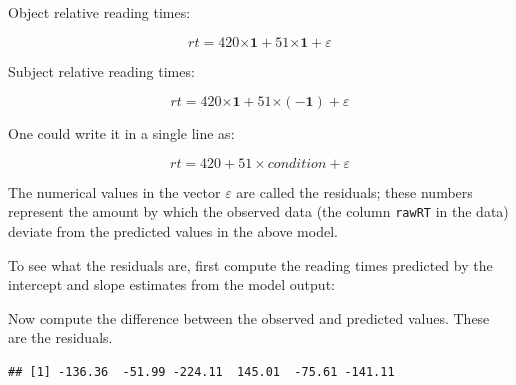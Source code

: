 \documentclass[
  12pt,
]{krantz}
\newenvironment{Shaded}{\begin{snugshade}}{\end{snugshade}}
\newcommand{\AttributeTok}[1]{\textcolor[rgb]{0.77,0.63,0.00}{#1}}
\newcommand{\DecValTok}[1]{\textcolor[rgb]{0.00,0.00,0.81}{#1}}
\newcommand{\FunctionTok}[1]{\textcolor[rgb]{0.00,0.00,0.00}{#1}}
\newcommand{\NormalTok}[1]{#1}
\newcommand{\OtherTok}[1]{\textcolor[rgb]{0.56,0.35,0.01}{#1}}
\newcommand{\SpecialCharTok}[1]{\textcolor[rgb]{0.00,0.00,0.00}{#1}}
\theoremstyle{definition}
\theoremstyle{definition}
\theoremstyle{definition}
\theoremstyle{definition}
\theoremstyle{remark}
\begin{document}
Object relative reading times:

\begin{equation}
rt = 420\mathbf{\times 1} + 51\mathbf{\times 1} + \varepsilon
\end{equation}

Subject relative reading times:

\begin{equation}
rt = 420\mathbf{\times 1} + 51\mathbf{\times (-1)} + \varepsilon
\end{equation}

One could write it in a single line as:

\begin{equation}
rt = 420 + 51\times condition + \varepsilon
\end{equation}

The numerical values in the vector \(\varepsilon\) are called the residuals; these numbers represent the amount by which the observed data (the column \texttt{rawRT} in the data) deviate from the predicted values in the above model.

To see what the residuals are, first compute the reading times predicted by the intercept and slope estimates from the model output:

\begin{Shaded}
\end{Shaded}

Now compute the difference between the observed and predicted values. These are the residuals.

\begin{Shaded}
\end{Shaded}

\begin{verbatim}
## [1] -136.36  -51.99 -224.11  145.01  -75.61 -141.11
\end{verbatim}
\end{document}
